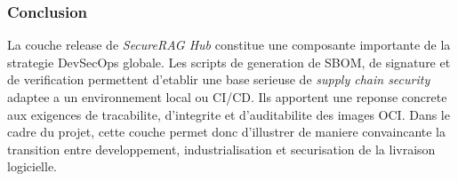\subsubsection{Conclusion}

La couche release de \textit{SecureRAG Hub} constitue une composante importante de la strategie DevSecOps globale. Les scripts de generation de SBOM, de signature et de verification permettent d'etablir une base serieuse de \textit{supply chain security} adaptee a un environnement local ou CI/CD. Ils apportent une reponse concrete aux exigences de tracabilite, d'integrite et d'auditabilite des images OCI. Dans le cadre du projet, cette couche permet donc d'illustrer de maniere convaincante la transition entre developpement, industrialisation et securisation de la livraison logicielle.
